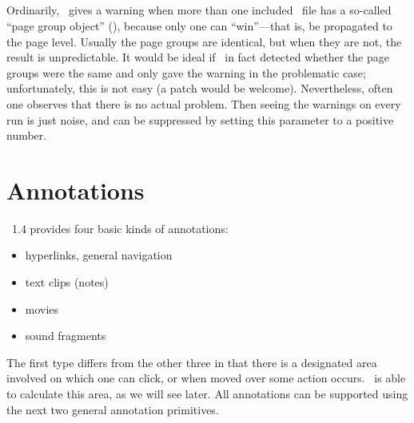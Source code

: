 \documentclass{pdftexmanual}
\begin{document}
\subsection{}

Ordinarily, \PDFTEX\ gives a warning when more than one included \PDF\
file has a so-called ``page group object'' (), because only
one can ``win''---that is, be propagated to the page level.  Usually
the page groups are identical, but when they are not, the result is
unpredictable.  It would be ideal if \PDFTEX\ in fact detected whether
the page groups were the same and only gave the warning in the
problematic case; unfortunately, this is not easy (a patch would be
welcome).  Nevertheless, often one observes that there is no actual
problem.  Then seeing the warnings on every run is just noise, and can
be suppressed by setting this parameter to a positive number.

\section{Annotations}

\PDF\ 1.4 provides four basic kinds of annotations:

\begin{itemize}
\item hyperlinks, general navigation
\item text clips (notes)
\item movies
\item sound fragments
\end{itemize}

The first type differs from the other three in that there is a
designated area involved on which one can click, or when moved over some
action occurs. \PDFTEX\ is able to calculate this area, as we will see
later. All annotations can be supported using the next two general
annotation primitives.

\subsection{}
\pdftexprimitive{\Syntax{\cs{pdfannot} \Something{annot type spec}
  \Modelist{h, v, m}}}

\noindent{}
\end{document}
